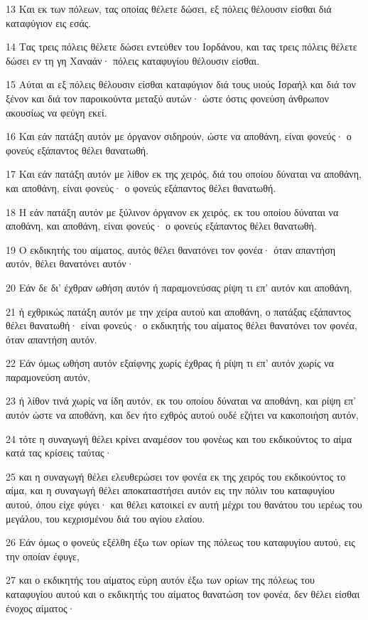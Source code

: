 \par 13 Και εκ των πόλεων, τας οποίας θέλετε δώσει, εξ πόλεις θέλουσιν είσθαι διά καταφύγιον εις εσάς.
\par 14 Τας τρεις πόλεις θέλετε δώσει εντεύθεν του Ιορδάνου, και τας τρεις πόλεις θέλετε δώσει εν τη γη Χαναάν· πόλεις καταφυγίου θέλουσιν είσθαι.
\par 15 Αύται αι εξ πόλεις θέλουσιν είσθαι καταφύγιον διά τους υιούς Ισραήλ και διά τον ξένον και διά τον παροικούντα μεταξύ αυτών· ώστε όστις φονεύση άνθρωπον ακουσίως να φεύγη εκεί.
\par 16 Και εάν πατάξη αυτόν με όργανον σιδηρούν, ώστε να αποθάνη, είναι φονεύς· ο φονεύς εξάπαντος θέλει θανατωθή.
\par 17 Και εάν πατάξη αυτόν με λίθον εκ της χειρός, διά του οποίου δύναται να αποθάνη, και αποθάνη, είναι φονεύς· ο φονεύς εξάπαντος θέλει θανατωθή.
\par 18 Η εάν πατάξη αυτόν με ξύλινον όργανον εκ χειρός, εκ του οποίου δύναται να αποθάνη, και αποθάνη, είναι φονεύς· ο φονεύς εξάπαντος θέλει θανατωθή.
\par 19 Ο εκδικητής του αίματος, αυτός θέλει θανατόνει τον φονέα· όταν απαντήση αυτόν, θέλει θανατόνει αυτόν·
\par 20 Εάν δε δι' έχθραν ωθήση αυτόν ή παραμονεύσας ρίψη τι επ' αυτόν και αποθάνη,
\par 21 ή εχθρικώς πατάξη αυτόν με την χείρα αυτού και αποθάνη, ο πατάξας εξάπαντος θέλει θανατωθή· είναι φονεύς· ο εκδικητής του αίματος θέλει θανατόνει τον φονέα, όταν απαντήση αυτόν.
\par 22 Εάν όμως ωθήση αυτόν εξαίφνης χωρίς έχθρας ή ρίψη τι επ' αυτόν χωρίς να παραμονεύση αυτόν,
\par 23 ή λίθον τινά χωρίς να ίδη αυτόν, εκ του οποίου δύναται να αποθάνη, και ρίψη επ' αυτόν ώστε να αποθάνη, και δεν ήτο εχθρός αυτού ουδέ εζήτει να κακοποιήση αυτόν,
\par 24 τότε η συναγωγή θέλει κρίνει αναμέσον του φονέως και του εκδικούντος το αίμα κατά τας κρίσεις ταύτας·
\par 25 και η συναγωγή θέλει ελευθερώσει τον φονέα εκ της χειρός του εκδικούντος το αίμα, και η συναγωγή θέλει αποκαταστήσει αυτόν εις την πόλιν του καταφυγίου αυτού, όπου είχε φύγει· και θέλει κατοικεί εν αυτή μέχρι του θανάτου του ιερέως του μεγάλου, του κεχρισμένου διά του αγίου ελαίου.
\par 26 Εάν όμως ο φονεύς εξέλθη έξω των ορίων της πόλεως του καταφυγίου αυτού, εις την οποίαν έφυγε,
\par 27 και ο εκδικητής του αίματος εύρη αυτόν έξω των ορίων της πόλεως του καταφυγίου αυτού και ο εκδικητής του αίματος θανατώση τον φονέα, δεν θέλει είσθαι ένοχος αίματος·
